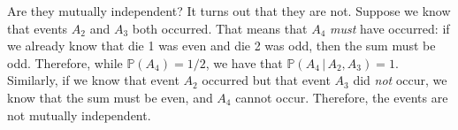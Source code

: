 \documentclass[11pt,letterpaper]{article}
\begin{document}
\begin{enumerate}[label=\alph*.]
Are they mutually independent? It turns out that they are not. Suppose we know that events $A_2$ and $A_3$ both occurred. That means that $A_4$ \emph{must} have occurred: if we already know that die 1 was even and die 2 was odd, then the sum must be odd. Therefore, while $\mathbb P(A_4) = 1/2$, we have that $\mathbb P(A_4 \,|\, A_2, A_3) = 1$. Similarly, if we know that event $A_2$ occurred but that event $A_3$ did \emph{not} occur, we know that the sum must be even, and $A_4$ cannot occur. Therefore, the events are not mutually independent.

\end{enumerate}
\end{document}
